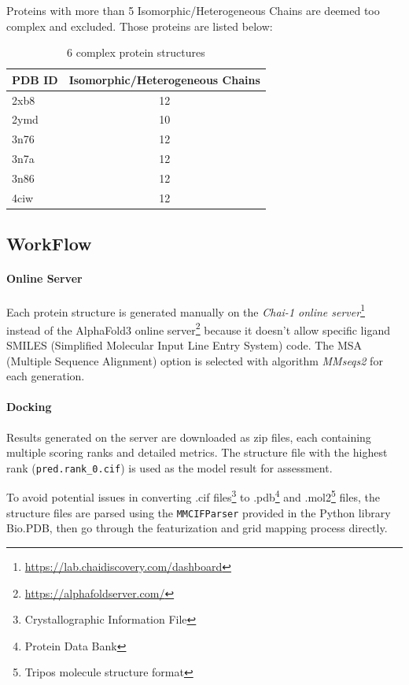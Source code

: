 \documentclass[unnumsec,webpdf,contemporary,large]{oup-authoring-template}
\theoremstyle{thmstyleone}%
\theoremstyle{thmstyletwo}%
\theoremstyle{thmstylethree}%
\begin{document}
Proteins with more than 5 Isomorphic/Heterogeneous Chains are deemed too complex and excluded. Those proteins are listed below:

\begin{table}[!t]
\centering
\caption{6 complex protein structures}
\label{tab:complex}
\begin{tabular}{lc}
\toprule
PDB ID & Isomorphic/Heterogeneous Chains \\
\midrule
2xb8 & 12 \\
2ymd & 10 \\
3n76 & 12 \\
3n7a & 12 \\
3n86 & 12 \\
4ciw & 12 \\
\bottomrule
\end{tabular}
\end{table}

\subsection{WorkFlow}

\paragraph{Online Server}
Each protein structure is generated manually on the \textit{Chai-1 online server}\footnote{\url{https://lab.chaidiscovery.com/dashboard}} instead of the AlphaFold3 online server\footnote{\url{https://alphafoldserver.com/}} because it doesn't allow specific ligand SMILES (Simplified Molecular Input Line Entry System) code. The MSA (Multiple Sequence Alignment) option is selected with algorithm \textit{MMseqs2} for each generation.

\paragraph{Docking}
Results generated on the server are downloaded as zip files, each containing multiple scoring ranks and detailed metrics. The structure file with the highest rank (\texttt{pred.rank\_0.cif}) is used as the model result for assessment.

To avoid potential issues in converting .cif files\footnote{Crystallographic Information File} to .pdb\footnote{Protein Data Bank} and .mol2\footnote{Tripos molecule structure format} files, the structure files are parsed using the \texttt{MMCIFParser} provided in the Python library Bio.PDB, then go through the featurization and grid mapping process directly.
\end{document}
